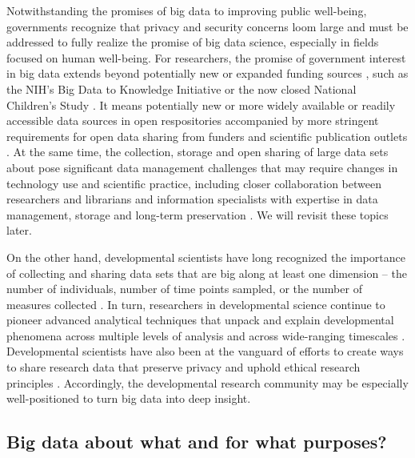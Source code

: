 Notwithstanding the promises of big data to improving public well-being, governments recognize that privacy and security concerns loom large \cite{Obama2014, Vinton2015} and must be addressed to fully realize the promise of big data science, especially in fields focused on human well-being.
For researchers, the promise of government interest in big data extends beyond potentially new or expanded funding sources \cite{NSFBigData}, such as the NIH's Big Data to Knowledge Initiative \cite{BD2K2015} or the now closed National Children's Study \cite{NCS2015}.
It means potentially new or more widely available or readily accessible data sources in open respositories \cite{databrary.org, dataverse.org, ICSPR, macwhinney_childes_2001} accompanied by more stringent requirements for open data sharing from funders \cite{NIMH2015, NSF2011, GatesFdn} and scientific publication outlets \cite{nosek_promoting_2015}.
At the same time, the collection, storage and open sharing of large data sets about pose significant data management challenges that may require changes in technology use \cite{ProjectJupyter, osf} and scientific practice, including closer collaboration between researchers and librarians and information specialists with expertise in data management, storage and long-term preservation \cite{gordon_researcher-library_2015, lynch_big_2008}.
We will revisit these topics later.

On the other hand, developmental scientists have long recognized the importance of collecting and sharing data sets that are big along at least one dimension -- the number of individuals, number of time points sampled, or the number of measures collected \cite{macwhinney_childes_2001}.
In turn, researchers in developmental science continue to pioneer advanced analytical techniques that unpack and explain developmental phenomena across multiple levels of analysis and across wide-ranging timescales \cite{bakeman_sequential_2011, CDS2014, QuantDev}.
Developmental scientists have also been at the vanguard of efforts to create ways to share research data that preserve privacy and uphold ethical research principles \cite{Adolph2012, AERA2011, AERAVideo2015, Asilomar2014, Databrary2015}.
Accordingly, the developmental research community may be especially well-positioned to turn big data into deep insight.

\subsection{Big data about what and for what purposes?}

